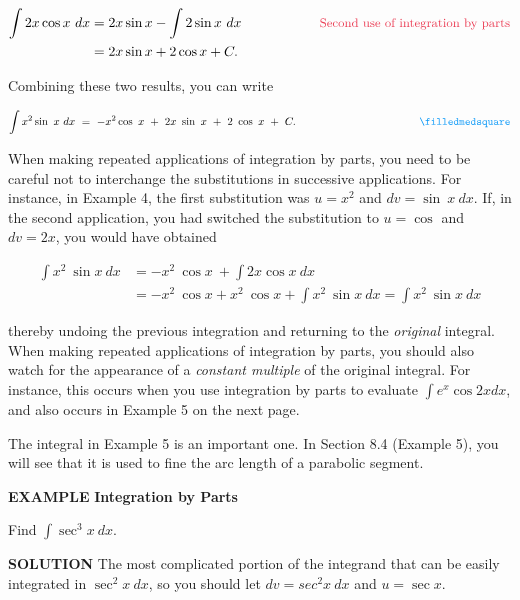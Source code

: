 \documentclass[12pt]{article}
\begin{document}
\begin{align*}
\int 2x \cos x \ dx &= 2x \sin x - \int 2 \sin x \ dx \hspace{2cm} \text{\color{mypink}\small Second use of integration by parts} \\
&= 2x \sin x + 2 \cos x + C.
\end{align*}

\noindent Combining these two results, you can write

$$ \int x^2  \sin \ x \ dx \ = \ -x^2  \cos \ x \ + \ 2x \ \sin \ x \ + \ 2 \ \cos \ x \ + \ C. \hspace{4cm} \color{myblue} \filledmedsquare$$

\vspace{1cm}

When making repeated applications of integration by parts, you need to be careful not to interchange the substitutions in successive applications. For instance, in Example 4, the first substitution was $u = x^2$ and $dv = \sin \ x \ dx$. If, in the second application, you had switched the substitution to $u = \cos$ and $dv = 2x$, you would have obtained

\begin{align*}
\int x^2 \ \sin x \ dx &= -x^2 \ \cos x \ + \int 2x \cos x \ dx \\
&= -x^2 \ \cos x + x^2 \ \cos x + \int x^2 \ \sin x \ dx = \int x^2 \ \sin x \ dx
\end{align*} 

\noindent thereby undoing the previous integration and returning to the \textit{original} integral. When making repeated applications of integration by parts, you should also watch for the appearance of a \textit{constant multiple} of the original integral. For instance, this occurs when you use integration by parts to evaluate $\int e^x \cos 2x dx$, and also occurs in Example 5 on the next page.

The integral in Example 5 is an important one. In Section 8.4 (Example 5), you will see that it is used to fine the arc length of a parabolic segment. 

\pagebreak

\noindent \color{myblue} \large \textbf{EXAMPLE} \color{black} \normalsize \textbf{Integration by Parts}
\rmfamily

\bigskip

\noindent Find $\displaystyle \int \sec^3 x \ dx$.
\sffamily

\bigskip

\noindent \color{myblue} \textbf{SOLUTION} \color{black} \rmfamily \hspace{.3cm}The most complicated portion of the integrand that can be easily integrated in $\sec^2 x \ dx$, so you should let $dv = sec^2 x \ dx$ and $u = \sec x$.
\end{document}
